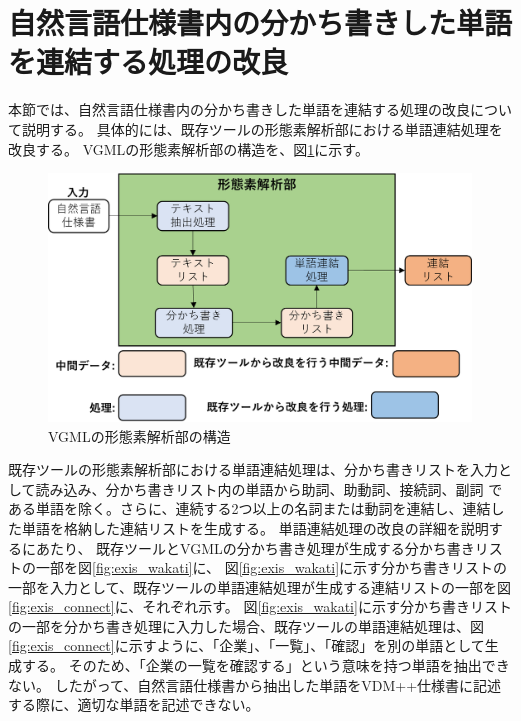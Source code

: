 \section{自然言語仕様書内の分かち書きした単語を連結する処理の改良}
本節では、自然言語仕様書内の分かち書きした単語を連結する処理の改良について説明する。
具体的には、既存ツールの形態素解析部における単語連結処理を改良する。
VGMLの形態素解析部の構造を、図\ref{fig:vgml_mor_structure}に示す。

\begin{figure}[t]
    \begin{center}
        \includegraphics[width=1.0\columnwidth]{image/vgml_mor_structure.png}
        \caption{VGMLの形態素解析部の構造}
        \label{fig:vgml_mor_structure}
    \end{center}
\end{figure}

既存ツールの形態素解析部における単語連結処理は、分かち書きリストを入力として読み込み、分かち書きリスト内の単語から助詞、助動詞、接続詞、副詞
である単語を除く。さらに、連続する2つ以上の名詞または動詞を連結し、連結した単語を格納した連結リストを生成する。
単語連結処理の改良の詳細を説明するにあたり、
既存ツールとVGMLの分かち書き処理が生成する分かち書きリストの一部を図\ref{fig:exis_wakati}に、
図\ref{fig:exis_wakati}に示す分かち書きリストの一部を入力として、既存ツールの単語連結処理が生成する連結リストの一部を図\ref{fig:exis_connect}に、それぞれ示す。
図\ref{fig:exis_wakati}に示す分かち書きリストの一部を分かち書き処理に入力した場合、既存ツールの単語連結処理は、図\ref{fig:exis_connect}に示すように、「企業」、「一覧」、「確認」を別の単語として生成する。
そのため、「企業の一覧を確認する」という意味を持つ単語を抽出できない。
したがって、自然言語仕様書から抽出した単語をVDM++仕様書に記述する際に、適切な単語を記述できない。

